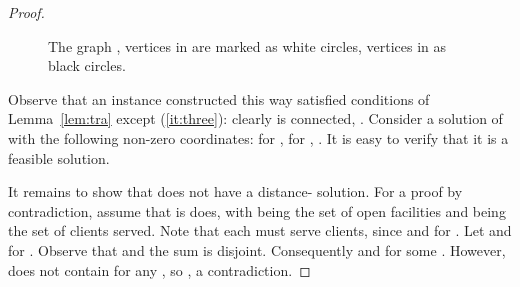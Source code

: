 \documentclass{article}
\theoremstyle{plain}
\theoremstyle{definition}
\begin{document}
\begin{proof}
\begin{figure}
\begin{center}
\begin{tikzpicture}[scale=.73,every node/.style={circle, inner sep = 3, }]
\end{tikzpicture}
\end{center}
\caption{\label{fig:ex}
The graph , vertices in  are marked as white circles, vertices in  as black circles.}

\end{figure}
 Observe that an instance  constructed this way satisfied conditions of Lemma~\ref{lem:tra} except (\ref{it:three}):
clearly  is connected, . Consider a solution  of  with the following
non-zero coordinates:  for ,  for , .
It is easy to verify that it is a feasible solution.

It remains to show that  does not have a distance- solution.
For a proof by contradiction, assume that is does, with  being the set of open facilities and 
being the set of clients served.
Note that each  must serve  clients, since  and  for .
Let  and  for .
Observe that  and the sum is disjoint. Consequently  and   for some .
However,  does not contain  for any , so , a contradiction.
\end{proof}
\end{document}
